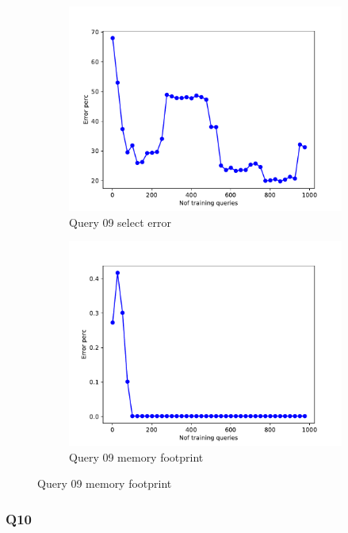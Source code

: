 \begin{figure}[!htb]
  \begin{subfigure}[t]{0.5\textwidth}
    \includegraphics[scale=0.4]{figs/airtraffic/airtraffic_sel09_error.pdf}
    \caption{Query 09 select error}
    \label{fig:sel09}
  \end{subfigure}
  \begin{subfigure}[t]{0.5\textwidth}
    \includegraphics[scale=0.4]{figs/airtraffic/airtraffic_q09_memerror.pdf}
    \caption{Query 09 memory footprint}
    \label{fig:mem09}
   \end{subfigure}
\end{figure}

\subsubsection{Q10}

